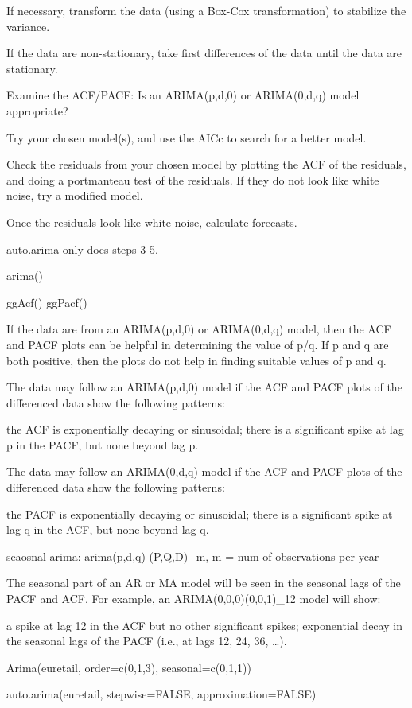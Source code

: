 \documentclass[]{book}
\begin{document}
If necessary, transform the data (using a Box-Cox transformation) to
stabilize the variance.

If the data are non-stationary, take first differences of the data until
the data are stationary.

Examine the ACF/PACF: Is an ARIMA(p,d,0) or ARIMA(0,d,q) model
appropriate?

Try your chosen model(s), and use the AICc to search for a better model.

Check the residuals from your chosen model by plotting the ACF of the
residuals, and doing a portmanteau test of the residuals. If they do not
look like white noise, try a modified model.

Once the residuals look like white noise, calculate forecasts.

auto.arima only does steps 3-5.

arima()

ggAcf() \textbar{} ggPacf()

If the data are from an ARIMA(p,d,0) or ARIMA(0,d,q) model, then the ACF
and PACF plots can be helpful in determining the value of p/q. If p and
q are both positive, then the plots do not help in finding suitable
values of p and q.

The data may follow an ARIMA(p,d,0) model if the ACF and PACF plots of
the differenced data show the following patterns:

the ACF is exponentially decaying or sinusoidal; there is a significant
spike at lag p in the PACF, but none beyond lag p.

The data may follow an ARIMA(0,d,q) model if the ACF and PACF plots of
the differenced data show the following patterns:

the PACF is exponentially decaying or sinusoidal; there is a significant
spike at lag q in the ACF, but none beyond lag q.

seaosnal arima: arima(p,d,q) (P,Q,D)\_m, m = num of observations per
year

The seasonal part of an AR or MA model will be seen in the seasonal lags
of the PACF and ACF. For example, an ARIMA(0,0,0)(0,0,1)\_12 model will
show:

a spike at lag 12 in the ACF but no other significant spikes;
exponential decay in the seasonal lags of the PACF (i.e., at lags 12,
24, 36, \ldots{}).

Arima(euretail, order=c(0,1,3), seasonal=c(0,1,1))

auto.arima(euretail, stepwise=FALSE, approximation=FALSE)
\end{document}
